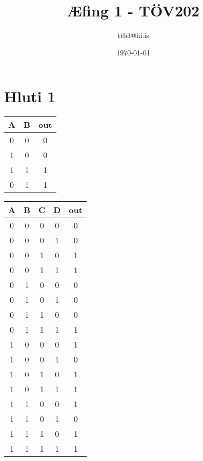 \documentclass{article}
\title{Æfing 1 - TÖV202}
\author{ttb3@hi.is}
\date{\today}
\begin{document}
\maketitle


\section*{Hluti 1}
\begin{center}
    \begin{tabular}{|c|c|c|}
        \hline
        A & B & out\\
        \hline
        0 & 0 & 0\\
        \hline
        1 & 0 & 0\\
        \hline
        1 & 1 & 1\\
        \hline
        0 & 1 & 1\\
        \hline
    \end{tabular}
\end{center}
\begin{center}
    \begin{tabular}{|c|c|c|c|c|}
        \hline
        A&B&C&D&out\\
        \hline
        0&0&0&0&0\\
        \hline
        0&0&0&1&0\\
        \hline
        0&0&1&0&1\\
        \hline
        0&0&1&1&1\\
        \hline
        0&1&0&0&0\\
        \hline
        0&1&0&1&0\\
        \hline
        0&1&1&0&0\\
        \hline
        0&1&1&1&1\\
        \hline
        1&0&0&0&1\\
        \hline
        1&0&0&1&0\\
        \hline
        1&0&1&0&1\\
        \hline
        1&0&1&1&1\\
        \hline
        1&1&0&0&1\\
        \hline
        1&1&0&1&0\\
        \hline
        1&1&1&0&1\\
        \hline
        1&1&1&1&1\\
        \hline
    \end{tabular}
\end{center}
\end{document}
